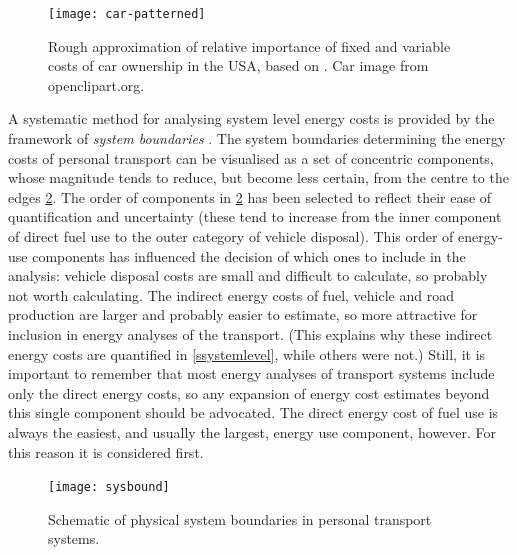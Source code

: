 \begin{figure}[h]
 \begin{center}
 \texttt{[image: car-patterned]}\end{center}
 \caption[Relative importance of fixed and variable costs
of car ownership]{Rough approximation of relative importance of fixed and
variable costs of car ownership in the USA, based on
 \citet[p.~114]{Smil1993}. Car image from openclipart.org.}
 \label{fcar-patterned}
\end{figure}

A systematic method for analysing system level energy costs is
provided by the framework of \emph{system boundaries}
\citep{Ekvall2004-lifecycle}. 
The system boundaries determining the energy costs
of personal transport can be visualised as a set of concentric components,
whose magnitude tends to reduce, but become less certain, from the centre to
the edges \cref{f:sysbound}. The order of components in \cref{f:sysbound} has
been selected to reflect their ease of quantification and uncertainty (these
tend to increase from the inner component of direct fuel use to the outer
category of vehicle disposal). This order of energy-use components has
influenced the decision of which ones to include in the analysis: vehicle
disposal costs are small and difficult to calculate, so probably not worth
calculating. The indirect energy costs of fuel, vehicle and road production are
larger and probably easier to estimate, so more attractive for inclusion in
energy analyses of the transport. (This explains why these indirect energy
costs are quantified in \cref{ssystemlevel}, while others were not.) Still, it
is important to remember that most energy analyses of transport
systems include only the direct energy costs, so any expansion of energy cost
estimates beyond this single component should be advocated.
The direct energy cost of fuel use is always the easiest, and usually the
largest, energy use component, however. For this reason it is considered first.

\begin{figure}[h]
 \begin{center}
 \texttt{[image: sysbound]}\end{center}
 \caption{Schematic of physical system boundaries in personal
 transport systems.}
 \label{f:sysbound}
\end{figure}


